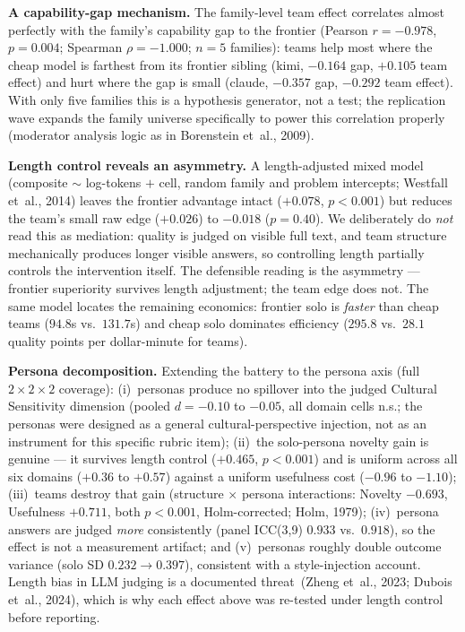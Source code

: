 \documentclass[12pt,a4paper]{article}
\begin{document}
\textbf{A capability-gap mechanism.} The family-level team effect correlates
almost perfectly with the family's capability gap to the frontier
(Pearson $r = -0.978$, $p = 0.004$; Spearman $\rho = -1.000$; $n = 5$
families): teams help most where the cheap model is farthest from its frontier
sibling (kimi, $-0.164$ gap, $+0.105$ team effect) and hurt where the gap is
small (claude, $-0.357$ gap, $-0.292$ team effect). With only five families
this is a hypothesis generator, not a test; the replication wave expands the
family universe specifically to power this correlation properly
(moderator analysis logic as in Borenstein et~al., 2009).

\textbf{Length control reveals an asymmetry.} A length-adjusted mixed model
(composite $\sim$ log-tokens $+$ cell, random family and problem intercepts;
Westfall et~al., 2014) leaves the frontier advantage intact ($+0.078$,
$p < 0.001$) but reduces the team's small raw edge ($+0.026$) to $-0.018$
($p = 0.40$). We deliberately do \emph{not} read this as mediation: quality is
judged on visible full text, and team structure mechanically produces longer
visible answers, so controlling length partially controls the intervention
itself. The defensible reading is the asymmetry --- frontier superiority
survives length adjustment; the team edge does not. The same model locates the
remaining economics: frontier solo is \emph{faster} than cheap teams ($94.8$s
vs.\ $131.7$s) and cheap solo dominates efficiency ($295.8$ vs.\ $28.1$
quality points per dollar-minute for teams).

\textbf{Persona decomposition.} Extending the battery to the persona axis
(full $2\times2\times2$ coverage): (i)~personas produce no spillover into the
judged Cultural Sensitivity dimension (pooled $d = -0.10$ to $-0.05$, all
domain cells n.s.; the personas were designed as a general cultural-perspective
injection, not as an instrument for this specific rubric item); (ii)~the
solo-persona novelty gain is genuine --- it survives length control
($+0.465$, $p < 0.001$) and is uniform across all six domains ($+0.36$ to
$+0.57$) against a uniform usefulness cost ($-0.96$ to $-1.10$); (iii)~teams
destroy that gain (structure $\times$ persona interactions: Novelty $-0.693$,
Usefulness $+0.711$, both $p < 0.001$, Holm-corrected; Holm, 1979);
(iv)~persona answers are judged \emph{more} consistently (panel ICC(3,9)
$0.933$ vs.\ $0.918$), so the effect is not a measurement artifact; and
(v)~personas roughly double outcome variance (solo SD $0.232 \to 0.397$),
consistent with a style-injection account. Length bias in LLM judging is a
documented threat~(Zheng et~al., 2023; Dubois et~al., 2024), which is why each
effect above was re-tested under length control before reporting.
\end{document}
